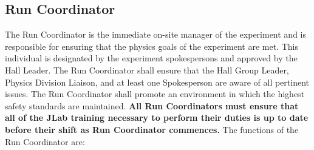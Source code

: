 \documentclass[11pt]{article}
\begin{document}
\subsection{Run Coordinator}
\indent

The Run Coordinator is the  immediate on-site manager of the experiment 
and is responsible for ensuring that the physics goals of the experiment 
are met. This individual is designated by the experiment spokespersons 
and approved by the Hall Leader.  The Run Coordinator shall ensure that 
the Hall Group Leader, Physics Division Liaison, and at least 
one Spokesperson are aware of all pertinent issues. The Run Coordinator
shall promote an environment in which the highest safety
standards are maintained.
{\bf All Run Coordinators must ensure that all of the JLab training necessary to perform 
their duties is up to date before their shift as Run Coordinator commences.}
The functions of the Run Coordinator  are: 
\end{document}
